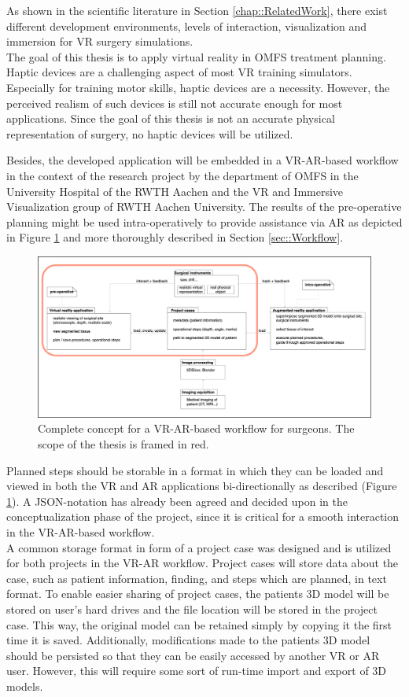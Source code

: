 As shown in the scientific literature in Section \ref{chap::RelatedWork}, there exist different development environments, levels of interaction, visualization and immersion for VR surgery simulations.
\\ The goal of this thesis is to apply virtual reality in OMFS treatment planning.
Haptic devices are a challenging aspect of most VR training simulators.
Especially for training motor skills, haptic devices are a necessity.
However, the perceived realism of such devices is still not accurate enough for most applications.
Since the goal of this thesis is not an accurate physical representation of surgery, no haptic devices will be utilized.

Besides, the developed application will be embedded in a VR-AR-based workflow in the context of the research project by the department of OMFS in the University 
Hospital of the RWTH Aachen and the VR and Immersive Visualization group of RWTH Aachen University.
The results of the pre-operative planning might be used intra-operatively to provide assistance via AR as depicted in Figure \ref{fig::ProjectPlan} and more thoroughly described in Section \ref{sec::Workflow}.
\begin{figure}[ht]
    \centering
    \includegraphics[width=\linewidth]{images/project_plan.png}
    \caption{\label{fig::ProjectPlan} Complete concept for a VR-AR-based workflow for surgeons. The scope of the thesis is framed in red.}
\end{figure}
Planned steps should be storable in a format in which they can be loaded and viewed in both the VR and AR applications bi-directionally as described (Figure \ref{fig::ProjectPlan}).
A JSON-notation has already been agreed and decided upon in the conceptualization phase of the project, since it is critical for a smooth 
interaction in the VR-AR-based workflow.
\\ A common storage format in form of a project case was designed and is utilized for both projects in the VR-AR workflow.
Project cases will store data about the case, such as patient information, finding, and steps which are planned, in text format.
To enable easier sharing of project cases, the patients 3D model will be stored on user's hard drives and the file location will be stored in the project case. 
This way, the original model can be retained simply by copying it the first time it is saved.
Additionally, modifications made to the patients 3D model should be persisted so that they can be easily accessed by another VR or AR user. 
However, this will require some sort of run-time import and export of 3D models.

